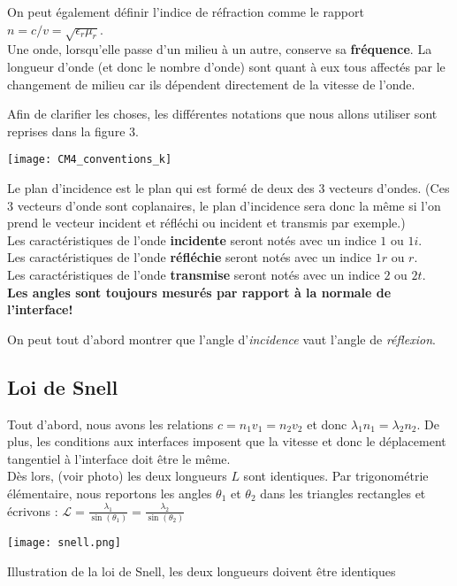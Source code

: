 On peut également définir l'indice de réfraction comme le rapport $n = c/v = \sqrt{\epsilon_{r}\mu_r}$.  \\

Une onde, lorsqu'elle passe d'un milieu à un autre, conserve sa \textbf{fréquence}. La longueur d'onde (et donc le nombre d'onde) sont quant à eux tous affectés 
par le changement de milieu car ils dépendent directement de la vitesse de l'onde.


Afin de clarifier les choses, les différentes notations que nous allons utiliser sont reprises dans la figure 3.
\begin{marginfigure}
\texttt{[image: CM4\_conventions\_k]}
\caption{Le plan d'incidence est le plan qui est formé de deux des 3 vecteurs d'ondes. (Ces 3 vecteurs d'onde sont coplanaires, le plan d'incidence sera donc la même si l'on prend le vecteur incident et réfléchi ou incident et transmis par exemple.)\\
Les caractéristiques de l'onde \textbf{incidente} seront notés avec un indice $1$ ou $1i$.\\
Les caractéristiques de l'onde \textbf{réfléchie} seront notés avec un indice $1r$ ou $r$. \\
Les caractéristiques de l'onde \textbf{transmise} seront notés avec un indice $2$ ou $2t$. \\
\textbf{Les angles sont toujours mesurés par rapport à la normale de l'interface!}}
\end{marginfigure}

On peut tout d'abord montrer que l'angle d'\textit{incidence} vaut l'angle de \textit{réflexion}. 

\subsection{Loi de Snell}

Tout d'abord, nous avons les relations  $c = n_{1} v_{1} = n_{2} v_{2}$ et donc $\lambda_{1} n_{1}= \lambda_{2} n_{2}$.
De plus, les conditions aux interfaces imposent que la vitesse et donc le déplacement tangentiel à l'interface doit être le même. \\
Dès lors, (voir photo) les deux longueurs $L$ sont identiques. Par trigonométrie élémentaire, nous reportons les angles $\theta_{1}$ et $\theta_{2}$ 
dans les triangles rectangles et écrivons : $\mathcal{L} = \frac{\lambda_{1}}{\sin(\theta_{1})} = \frac{\lambda_{2}}{\sin(\theta_{2})}$


\begin{marginfigure}
\texttt{[image: snell.png]}
\caption{Illustration de la loi de Snell, les deux longueurs doivent être identiques}
\end{marginfigure}

